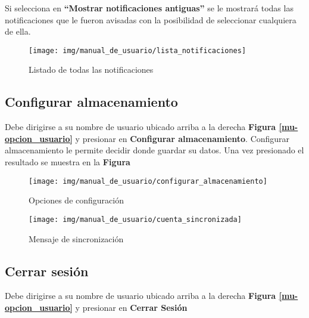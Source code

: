 Si selecciona en \textbf{``Mostrar notificaciones antiguas''} se le mostrará todas las notificaciones que le fueron avisadas con la posibilidad de seleccionar cualquiera de ella.

\begin{figure}
	\centering
	\texttt{[image: img/manual\_de\_usuario/lista\_notificaciones]}
	\caption{Listado de todas las notificaciones}
	\label{mu-lista_notificaciones}
\end{figure}

\subsection{Configurar almacenamiento}
Debe dirigirse a su nombre de usuario ubicado arriba a la derecha \textbf{Figura \ref{mu-opcion_usuario}} y presionar en \textbf{Configurar almacenamiento}. Configurar almacenamiento le permite decidir donde guardar su datos. Una vez presionado el resultado se muestra en la \textbf{Figura}

\begin{figure}
	\centering
	\texttt{[image: img/manual\_de\_usuario/configurar\_almacenamiento]}
	\caption{Opciones de configuración}
	\label{mu-configurar_almacenamiento}
\end{figure}
\begin{figure}
	\centering
	\texttt{[image: img/manual\_de\_usuario/cuenta\_sincronizada]}
	\caption{Mensaje de sincronización}
	\label{mu-cuenta_sincronizada}
\end{figure}
\subsection{Cerrar sesión}
Debe dirigirse a su nombre de usuario ubicado arriba a la derecha \textbf{Figura \ref{mu-opcion_usuario}} y presionar en \textbf{Cerrar Sesión}




\stopcontents
